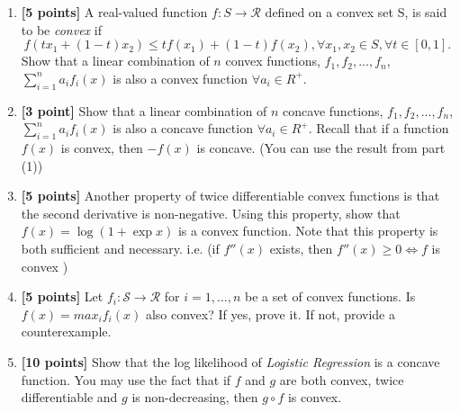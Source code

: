\begin{enumerate}
    \item \textbf{[5 points]} A real-valued function $f:S \rightarrow \mathcal{R}$ defined on a convex set S, is said to be \textit{convex} if $$f(tx_{1}+(1-t)x_{2})\leq tf(x_{1})+(1-t)f(x_{2}), \forall x_{1},x_{2}\in S,\forall t\in [0,1].$$
    Show that a linear combination of $n$ convex functions, $f_1, f_2,...,f_n$, $\sum_{i=1}^n a_if_i(x)$ is also a convex function  $\forall a_i \in R^+$. 


\begin{tcolorbox}[fit,height=7cm,width=.95\textwidth,blank,borderline={1pt}{-2pt},nobeforeafter]
\end{tcolorbox}

\clearpage
\item \textbf{[3 point]} Show that a linear combination of $n$ concave functions, $f_1, f_2,...,f_n$, $\sum_{i=1}^n a_if_i(x)$ is also a concave function  $\forall a_i \in R^+$. Recall that if a function $f(x)$ is convex, then $-f(x)$ is concave. (You can use the result from part (1)) 
    

\begin{tcolorbox}[fit,height=7cm,width=.95\textwidth,blank,borderline={1pt}{-2pt},nobeforeafter]
 \end{tcolorbox}
  
\item \textbf{[5 points]} Another property of twice differentiable convex functions is that the second derivative is non-negative. Using this property, show that $f (x) = \log (1 + \exp x)$ is a convex function. Note that this property is both sufficient and necessary. i.e. (if $f''(x)$ exists, then $f''(x)\ge 0 \iff  f$ is convex ) 
    
\begin{tcolorbox}[fit,height=7cm,width=.95\textwidth,blank,borderline={1pt}{-2pt},nobeforeafter]
\end{tcolorbox}

\clearpage
\item \textbf{[5 points]} Let $f_i:\mathcal{S} \rightarrow \mathcal{R}$ for $i = 1, \ldots, n$ be a set of convex functions.
Is $f(x) = max_i f_i(x)$ also convex?
If yes, prove it. 
If not, provide a counterexample.  


\begin{tcolorbox}[fit,height=6cm,width=.95\textwidth,blank,borderline={1pt}{-2pt},nobeforeafter]
\end{tcolorbox}

\item \textbf{[10 points]} Show that the log likelihood of \textit{Logistic Regression} is a concave function. You may use the fact that if $f$ and $g$ are both convex, twice differentiable and $g$ is non-decreasing, then $g \circ f$ is convex. 
    
    
\begin{tcolorbox}[fit,height=12cm,width=.95\textwidth,blank,borderline={1pt}{-2pt},nobeforeafter]
\end{tcolorbox}
  
\end{enumerate}

